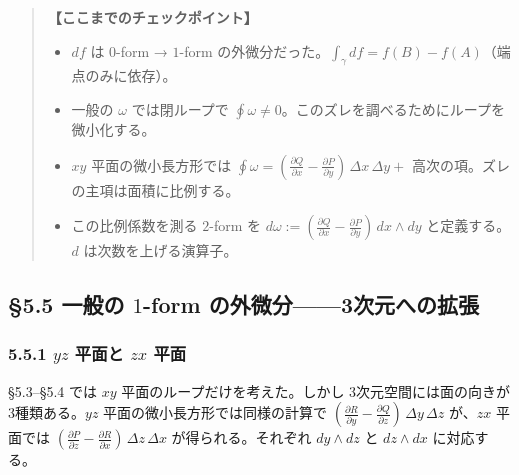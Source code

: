 \documentclass[a4paper,12pt,openany]{book}
\begin{document}
\begin{quote}
\textbf{【ここまでのチェックポイント】}

\begin{itemize}
\item
  \(df\) は \(0\)-form → \(1\)-form
  の外微分だった。\(\int_\gamma df = f(B)-f(A)\)（端点のみに依存）。
\item
  一般の \(\omega\) では閉ループで
  \(\oint \omega \neq 0\)。このズレを調べるためにループを微小化する。
\item
  \(xy\) 平面の微小長方形では
  \(\oint \omega = (\frac{\partial Q}{\partial x} - \frac{\partial P}{\partial y})\,\Delta x\,\Delta y +\)
  高次の項。ズレの主項は面積に比例する。
\item
  この比例係数を測る \(2\)-form を
  \(d\omega := (\frac{\partial Q}{\partial x} - \frac{\partial P}{\partial y})\,dx \wedge dy\)
  と定義する。\(d\) は次数を上げる演算子。
\end{itemize}
\end{quote}

\par\vspace{0.35em}\par

\hypertarget{ux4e00ux822cux306e-1-form-ux306eux5916ux5faeux52063ux6b21ux5143ux3078ux306eux62e1ux5f35}{%
\subsection{\texorpdfstring{§5.5 一般の \(1\)-form
の外微分——3次元への拡張}{§5.5 一般の 1-form の外微分——3次元への拡張}}\label{ux4e00ux822cux306e-1-form-ux306eux5916ux5faeux52063ux6b21ux5143ux3078ux306eux62e1ux5f35}}

\hypertarget{yz-ux5e73ux9762ux3068-zx-ux5e73ux9762}{%
\subsubsection{\texorpdfstring{5.5.1 \(yz\) 平面と \(zx\)
平面}{5.5.1 yz 平面と zx 平面}}\label{yz-ux5e73ux9762ux3068-zx-ux5e73ux9762}}

§5.3–§5.4 では \(xy\) 平面のループだけを考えた。しかし
3次元空間には面の向きが3種類ある。\(yz\)
平面の微小長方形では同様の計算で
\((\frac{\partial R}{\partial y} - \frac{\partial Q}{\partial z})\,\Delta y\,\Delta z\)
が、\(zx\) 平面では
\((\frac{\partial P}{\partial z} - \frac{\partial R}{\partial x})\,\Delta z\,\Delta x\)
が得られる。それぞれ \(dy \wedge dz\) と \(dz \wedge dx\) に対応する。
\end{document}
